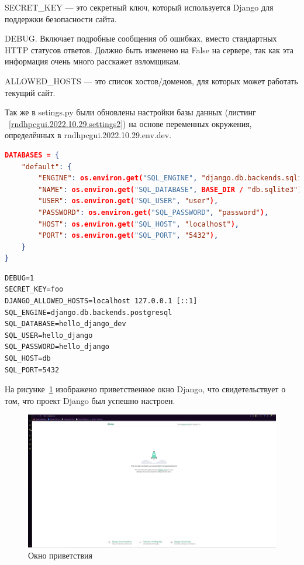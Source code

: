 \textsf{SECRET_KEY} — это секретный ключ, который используется Django для поддержки безопасности сайта.

\textsf{DEBUG}. Включает подробные сообщения об ошибках, вместо стандартных \textsf{HTTP} статусов ответов. Должно быть изменено на \textsf{False} на сервере, так как эта информация очень много расскажет взломщикам.

\textsf{ALLOWED_HOSTS} — это список хостов/доменов, для которых может работать текущий сайт.

Так же в \textsf{setings.py} были обновлены настройки базы данных (листинг ~\ref{rndhpcgui.2022.10.29.settings2}) на основе переменных окружения, определённых в \textsf{rndhpcgui.2022.10.29.env.dev}.

\begin{lstlisting}[frame=single, label={rndhpcgui.2022.10.29.settings2}, caption={Обновлённые переменные в \textsf{settings.py}}, language={json}] 
DATABASES = {
    "default": {
        "ENGINE": os.environ.get("SQL_ENGINE", "django.db.backends.sqlite3"),
        "NAME": os.environ.get("SQL_DATABASE", BASE_DIR / "db.sqlite3"),
        "USER": os.environ.get("SQL_USER", "user"),
        "PASSWORD": os.environ.get("SQL_PASSWORD", "password"),
        "HOST": os.environ.get("SQL_HOST", "localhost"),
        "PORT": os.environ.get("SQL_PORT", "5432"),
    }
}
\end{lstlisting}

\begin{lstlisting}[frame=single, label={rndhpcgui.2022.10.29.env.dev}, caption={Содержимое файла \textsf{.env.dev}}, language={aINIExample}] 
DEBUG=1
SECRET_KEY=foo
DJANGO_ALLOWED_HOSTS=localhost 127.0.0.1 [::1]
SQL_ENGINE=django.db.backends.postgresql
SQL_DATABASE=hello_django_dev
SQL_USER=hello_django
SQL_PASSWORD=hello_django
SQL_HOST=db
SQL_PORT=5432
\end{lstlisting}

На рисунке~\ref{rndhpcgui.2022.10.29.picture2} изображено приветственное окно \textsf{Django}, что свидетельствует о том, что проект \textsf{Django} был успешно настроен.

\begin{figure}[!ht]
  \centering
  \includegraphics[scale=0.8]{ResearchNotes/rndhpc_dev_gui_2022_10_29/rndhpcgui.2022.10.29.picture2.png}
  \caption{Окно приветствия}
  \label{rndhpcgui.2022.10.29.picture2}
\end{figure}

